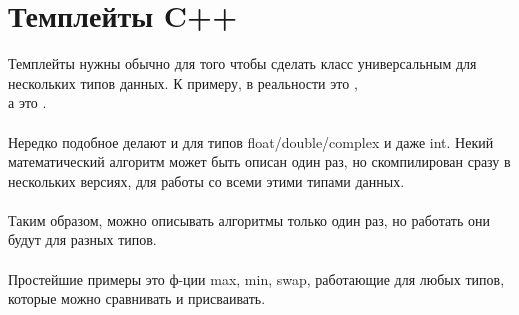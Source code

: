 \section{Темплейты C++}

Темплейты нужны обычно для того чтобы сделать класс универсальным для нескольких типов данных.
К примеру,  в реальности это , \\ 
а  это . \\
\\
Нередко подобное делают и для типов float/double/complex и даже int. 
Некий математический алгоритм может быть описан один раз,
но скомпилирован сразу в нескольких версиях, для работы со всеми этими типами данных. \\
\\
Таким образом, можно описывать алгоритмы только один раз, но работать они будут для разных типов. \\
\\
Простейшие примеры это ф-ции max, min, swap, работающие для любых типов, которые можно сравнивать
и присваивать.


